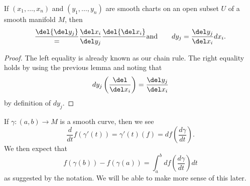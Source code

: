 \documentclass[../notes.tex]{subfiles}
\begin{document}
\begin{lemma}
	If $(x_1,\ldots,x_n)$ and $(y_1,\ldots,y_n)$ are smooth charts on an open subset $U$ of a smooth manifold $M$, then
	\[\frac\del{\del y_j}=\frac{\del x_i}{\del y_j}\frac\del{\del x_i}\qquad\text{and}\qquad dy_j=\frac{\del y_j}{\del x_i}dx_i.\]
\end{lemma}
\begin{proof}
	The left equality is already known as our chain rule. The right equality holds by using the previous lemma and noting that
	\[dy_j\left(\frac{\del}{\del x_i}\right)=\frac{\del y_j}{\del x_i}\]
	by definition of $dy_j$.
\end{proof}
\begin{remark}
	If $\gamma\colon(a,b)\to M$ is a smooth curve, then we see
	\[\frac d{dt}f(\gamma'(t))=\gamma'(t)(f)=df\left(\frac{d\gamma}{dt}\right).\]
	We then expect that
	\[f(\gamma(b))-f(\gamma(a))=\int_a^bdf\left(\frac{d\gamma}{dt}\right)dt\]
	as suggested by the notation. We will be able to make more sense of this later.
\end{remark}
\end{document}
